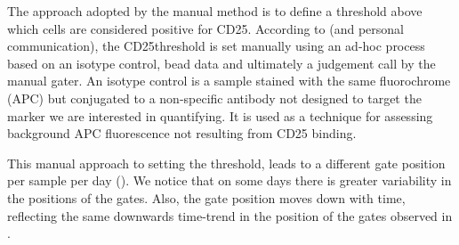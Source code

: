 The approach adopted by the manual method is to define a threshold above which cells are considered positive for CD25.
According to \citet{Dendrou:2009dv} (and  personal communication),
the CD25\positive threshold is set manually using an ad-hoc process based on an isotype control, bead data and ultimately a judgement call
by the manual gater.
An isotype control is a sample stained with the same fluorochrome (APC) but conjugated to a
non-specific antibody not designed to target the marker we are interested in quantifying.
It is used as a technique for assessing background APC fluorescence not resulting from CD25 binding.




This manual approach to setting the threshold, leads to a different gate position per sample per day ().
We notice that on some days there is greater variability in the positions of the gates.
Also, the gate position moves down with time, reflecting the same downwards time-trend in the position of the gates observed in .

